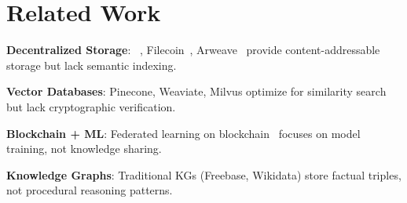 \section{Related Work}


\textbf{Decentralized Storage}: \IPFS{}~\cite{benet2014ipfs}, Filecoin~\cite{protocol2017filecoin}, Arweave~\cite{williams2019arweave} provide content-addressable storage but lack semantic indexing.

\textbf{Vector Databases}: Pinecone, Weaviate, Milvus optimize for similarity search but lack cryptographic verification.

\textbf{Blockchain + ML}: Federated learning on blockchain~\cite{kurtulmus2018trustless} focuses on model training, not knowledge sharing.

\textbf{Knowledge Graphs}: Traditional KGs (Freebase, Wikidata) store factual triples, not procedural reasoning patterns.

